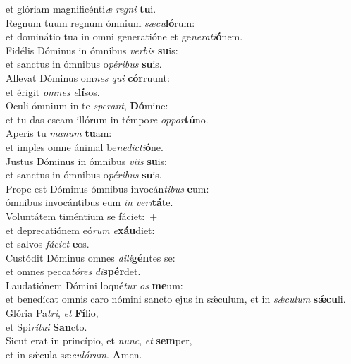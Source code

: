 \evenverse et glóriam magnificénti\textit{æ} \textit{re}\textit{gni} \textbf{tu}i.\\
\oddverse Regnum tuum regnum ómnium \textit{sæ}\textit{cu}\textbf{ló}rum:~\*\\
\oddverse et dominátio tua in omni generatióne et ge\textit{ne}\textit{ra}\textit{ti}\textbf{ó}nem.\\
\evenverse Fidélis Dóminus in ómnibus \textit{ver}\textit{bis} \textbf{su}is:~\*\\
\evenverse et sanctus in ómnibus o\textit{pé}\textit{ri}\textit{bus} \textbf{su}is.\\
\oddverse Allevat Dóminus om\textit{nes} \textit{qui} \textbf{cór}ruunt:~\*\\
\oddverse et érigit \textit{om}\textit{nes} \textit{e}\textbf{lí}sos.\\
\evenverse Oculi ómnium in te \textit{spe}\textit{rant}, \textbf{Dó}mine:~\*\\
\evenverse et tu das escam illórum in témpo\textit{re} \textit{op}\textit{por}\textbf{tú}no.\\
\oddverse Aperis tu \textit{ma}\textit{num} \textbf{tu}am:~\*\\
\oddverse et imples omne ánimal be\textit{ne}\textit{di}\textit{cti}\textbf{ó}ne.\\
\evenverse Justus Dóminus in ómnibus \textit{vi}\textit{is} \textbf{su}is:~\*\\
\evenverse et sanctus in ómnibus o\textit{pé}\textit{ri}\textit{bus} \textbf{su}is.\\
\oddverse Prope est Dóminus ómnibus invocán\textit{ti}\textit{bus} \textbf{e}um:~\*\\
\oddverse ómnibus invocántibus eum \textit{in} \textit{ve}\textit{ri}\textbf{tá}te.\\
\evenverse Voluntátem timéntium se fáciet:~+\\
\evenverse  et deprecatiónem eó\textit{rum} \textit{e}\textbf{xáu}diet:~\*\\
\evenverse et salvos \textit{fá}\textit{ci}\textit{et} \textbf{e}os.\\
\oddverse Custódit Dóminus omnes \textit{di}\textit{li}\textbf{gén}tes se:~\*\\
\oddverse et omnes pecca\textit{tó}\textit{res} \textit{di}\textbf{spér}det.\\
\evenverse Laudatiónem Dómini loqué\textit{tur} \textit{os} \textbf{me}um:~\*\\
\evenverse et benedícat omnis caro nómini sancto ejus in sǽculum, et in \textit{sǽ}\textit{cu}\textit{lum} \textbf{sǽ}\textbf{cu}li.\\
\oddverse Glória Pa\textit{tri}, \textit{et} \textbf{Fí}lio,~\*\\
\oddverse et Spi\textit{rí}\textit{tu}\textit{i} \textbf{San}cto.\\
\evenverse Sicut erat in princípio, et \textit{nunc}, \textit{et} \textbf{sem}per,~\*\\
\evenverse et in sǽcula sæ\textit{cu}\textit{ló}\textit{rum}. \textbf{A}men.\\
